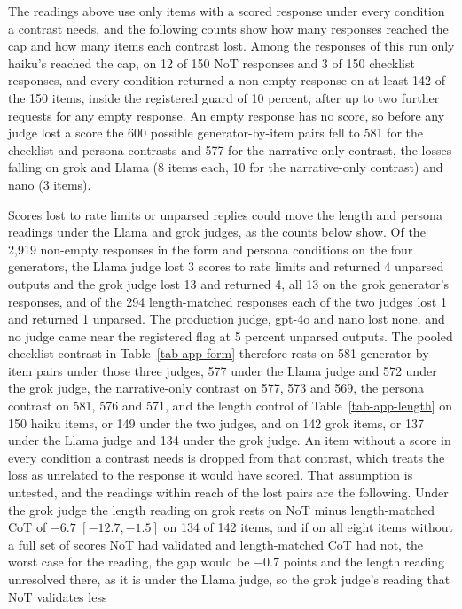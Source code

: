 The readings above use only items with a scored response under every
condition a contrast needs, and the following counts show how many responses
reached the cap and how many items each contrast lost.
Among the responses of this run only haiku's reached the cap, on 12 of 150
NoT responses and 3 of 150 checklist responses, and every condition returned
a non-empty response on at least 142 of the 150 items, inside the registered
guard of 10 percent, after up to two further requests for any empty
response. An empty response has no score, so before any judge lost a score
the 600 possible generator-by-item pairs fell to 581 for the checklist and
persona contrasts and 577 for the narrative-only contrast, the losses falling
on grok and Llama (8 items each, 10 for the narrative-only contrast) and
nano (3 items).

Scores lost to rate limits or unparsed replies could move the length and
persona readings under the Llama and grok judges, as the counts below show.
Of the 2,919 non-empty responses in the form and persona conditions on the
four generators, the Llama judge lost 3 scores to rate limits and returned 4
unparsed outputs and the grok judge lost 13 and returned 4, all 13 on the grok
generator's responses, and of the 294 length-matched responses each of the two
judges lost 1 and returned 1 unparsed. The production judge, gpt-4o and nano
lost none, and no judge came near the registered flag at 5 percent unparsed
outputs.
The pooled checklist contrast in Table~\ref{tab-app-form}
therefore rests on 581 generator-by-item pairs under those three judges, 577
under the Llama judge and 572 under the grok judge, the narrative-only
contrast on 577, 573 and 569, the persona contrast on 581, 576 and 571, and
the length control of Table~\ref{tab-app-length} on 150 haiku items, or 149
under the two judges, and on 142 grok items, or 137 under the Llama judge and
134 under the grok judge. An item without a score in every condition a
contrast needs is dropped from that contrast, which treats the loss as
unrelated to the response it would have scored. That assumption is untested,
and the readings within reach of the lost pairs are the following. Under the
grok judge the length reading on grok
rests on NoT minus length-matched CoT of $-6.7$ $[-12.7, -1.5]$ on 134 of 142
items, and if on all eight items without a full set of scores NoT had
validated and length-matched CoT had not, the worst case for the reading,
the gap would be $-0.7$ points and the length reading unresolved there, as it
is under the Llama judge, so the grok judge's reading that NoT validates less
